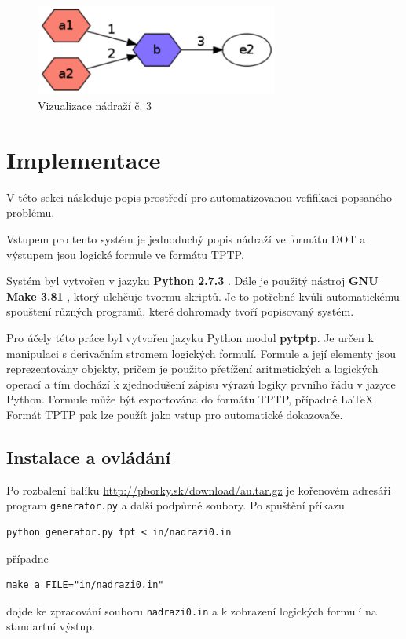 \documentclass[a4paper,journal]{IEEEtran}
\begin{document}
\begin{figure}[!h] %
  \centering
  \includegraphics[width=80mm]{nadrazi2}
  \caption{Vizualizace nádraží č. 3}
  \label{fig:nad3}
\end{figure}
\section{Implementace}\label{sec:imple}
V této sekci následuje popis prostředí pro automatizovanou vefifikaci popsaného problému.

Vstupem pro tento systém je jednoduchý popis nádraží ve formátu DOT \cite{Graphviz} a výstupem 
jsou logické formule ve formátu TPTP\cite{TPTP}.

Systém byl vytvořen v jazyku \textbf{Python 2.7.3} \cite{Python}. Dále je použitý nástroj \textbf{GNU Make 3.81} \cite{GNUMake},
ktorý ulehčuje tvormu skriptů. Je to potřebné kvůli automatickému spouštení různých programů, které dohromady tvoří popisovaný systém.

Pro účely této práce byl vytvořen jazyku Python modul \textbf{pytptp}.
Je určen k manipulaci s derivačním stromem logických formulí.
Formule a její elementy jsou reprezentovány objekty, pričem je použito přetížení aritmetických a logických operací 
a tím dochází k zjednodušení zápisu výrazů logiky prvního řádu v jazyce Python.
Formule může být exportována do formátu TPTP, případně \LaTeX.
Formát TPTP pak lze použít jako vstup pro automatické dokazovače.




\subsection{Instalace a ovládání}
Po rozbalení balíku \url{http://pborky.sk/download/au.tar.gz} je kořenovém adresáři program \texttt{generator.py} a další podpůrné soubory.  
Po spuštění příkazu
\begin{verbatim}
python generator.py tpt < in/nadrazi0.in
\end{verbatim}
případne
\begin{verbatim}
make a FILE="in/nadrazi0.in"
\end{verbatim}
dojde ke zpracování souboru \texttt{nadrazi0.in} a k zobrazení logických formulí na standartní výstup. 
\end{document}
